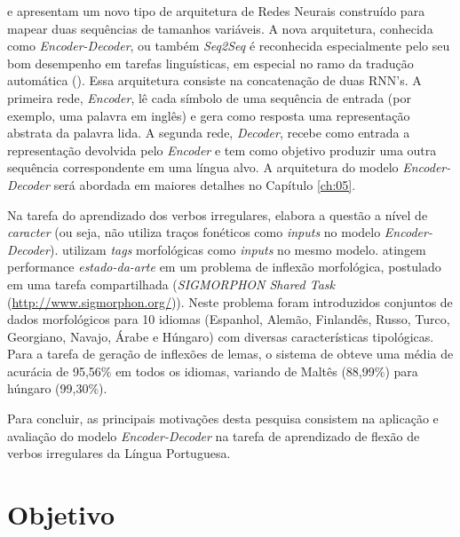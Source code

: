 \cite{enc-dec:2014} e \cite{seq2seq:2014} apresentam um novo tipo de arquitetura de Redes Neurais construído para mapear duas sequências de tamanhos variáveis. A nova arquitetura, conhecida como \textit{Encoder-Decoder}, ou também \textit{Seq2Seq} é reconhecida especialmente pelo seu bom desempenho em tarefas linguísticas, em especial no ramo da tradução automática (\cite{Wu:2016}). Essa arquitetura consiste na concatenação de duas RNN's. A primeira rede, \textit{Encoder}, lê cada símbolo de uma sequência de entrada (por exemplo, uma palavra em inglês) e gera como resposta uma representação abstrata da palavra lida. A segunda rede, \textit{Decoder}, recebe como entrada a representação devolvida pelo \textit{Encoder} e tem como objetivo produzir uma outra sequência correspondente em uma língua alvo. A arquitetura do modelo \textit{Encoder-Decoder} será abordada em maiores detalhes no Capítulo \ref{ch:05}.

Na tarefa do aprendizado dos verbos irregulares, \cite{faruqui:2015} elabora a questão a nível de \textit{caracter} (ou seja, não utiliza traços fonéticos como \textit{inputs} no modelo \textit{Encoder-Decoder}). \cite{kann-schutze-2016-med} utilizam \textit{tags} morfológicas como \textit{inputs} no mesmo modelo. \cite{cotterell-sigmorphon2016} atingem performance \textit{estado-da-arte} em um problema de inflexão morfológica, postulado em uma tarefa compartilhada (\textit{SIGMORPHON Shared Task} (\url{http://www.sigmorphon.org/})). Neste problema foram introduzidos conjuntos de dados morfológicos para 10 idiomas (Espanhol, Alemão, Finlandês, Russo, Turco, Georgiano, Navajo, Árabe e Húngaro) com diversas características tipológicas. Para a tarefa de geração de inflexões de lemas, o sistema de \cite{cotterell-sigmorphon2016} obteve uma média de acurácia de 95,56\% em todos os idiomas, variando de
Maltês (88,99\%) para húngaro (99,30\%).

Para concluir, as principais motivações desta pesquisa consistem na aplicação e avaliação do modelo \textit{Encoder-Decoder} na tarefa de aprendizado de flexão de verbos irregulares da Língua Portuguesa. 

\section{Objetivo}
\label{sec:objectives}

